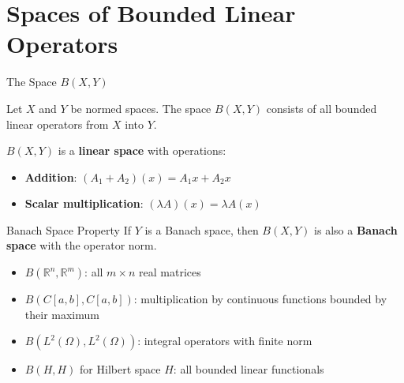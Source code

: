 \documentclass[aspectratio=169,10pt]{beamer}
\begin{document}
\section{Spaces of Bounded Linear Operators}

\begin{frame}{The Space $B(X, Y)$}
    \begin{definition}
        Let $X$ and $Y$ be normed spaces. The space $B(X, Y)$ consists of all bounded linear operators from $X$ into $Y$.
    \end{definition}

    \vspace{0.3cm}

    $B(X, Y)$ is a \textbf{linear space} with operations:
    \begin{itemize}
        \item \textbf{Addition}: $(A_1 + A_2)(x) = A_1x + A_2x$
        \item \textbf{Scalar multiplication}: $(\lambda A)(x) = \lambda A(x)$
    \end{itemize}

    \vspace{0.3cm}

    \begin{block}{Banach Space Property}
        If $Y$ is a Banach space, then $B(X, Y)$ is also a \textbf{Banach space} with the operator norm.
    \end{block}

    \vspace{0.3cm}

    \begin{examples}
        \begin{itemize}
            \item $B(\mathbb{R}^n, \mathbb{R}^m)$: all $m \times n$ real matrices
            \item $B(C[a,b], C[a,b])$: multiplication by continuous functions bounded by their maximum
            \item $B(L^2(\Omega), L^2(\Omega))$: integral operators with finite norm
            \item $B(H, H)$ for Hilbert space $H$: all bounded linear functionals
        \end{itemize}
    \end{examples}
\end{frame}
\end{document}
